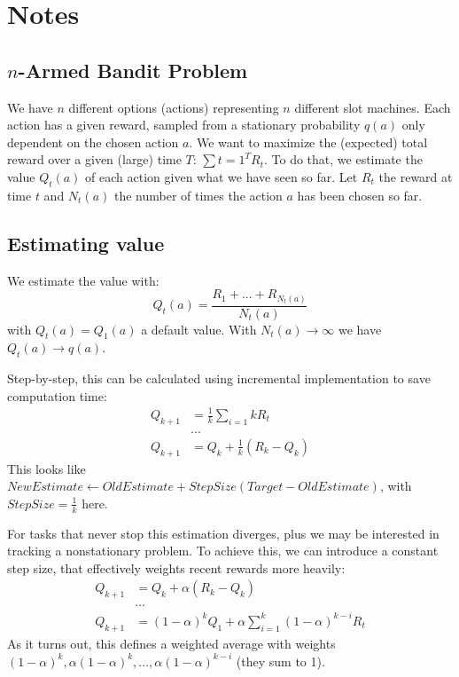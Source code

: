 
\section{Notes}

\subsection{$n$-Armed Bandit Problem}

We have $n$ different options (actions) representing $n$ different slot machines.
Each action has a given reward, sampled from a stationary probability $q(a)$ only dependent on the chosen action $a$.
We want to maximize the (expected) total reward over a given (large) time $T$: $\sum {t=1}^{T} R_t$.
To do that, we estimate the value $Q_t(a)$ of each action given what we have seen so far.
Let $R_t$ the reward at time $t$ and $N_t(a)$ the number of times the action $a$ has been chosen so far.


\subsection{Estimating value}
We estimate the value with:
\[
Q_t(a) = \frac{R_1 + ... + R_{N_{t}(a)}}{N_t(a)}
\]
with $Q_t(a) = Q_1(a)$ a default value.
With $N_t(a) \rightarrow \infty$ we have $Q_t(a) \rightarrow q(a)$.

Step-by-step, this can be calculated using incremental implementation to save computation time:
\begin{align*}
Q_{k+1} &= \frac{1}{k} \sum_{i=1}{k} R_t \\
        & ... \\
Q_{k+1} &= Q_k + \frac{1}{k} \left( R_k - Q_k \right)
\end{align*}
This looks like $\mathit{NewEstimate} \leftarrow \mathit{OldEstimate} + \mathit{StepSize} \left( \mathit{Target} - \mathit{OldEstimate} \right)$, with $\mathit{StepSize} = \frac{1}{k}$ here.

For tasks that never stop this estimation diverges, plus we may be interested in tracking a nonstationary problem.
To achieve this, we can introduce a constant step size, that effectively weights recent rewards more heavily:
\begin{align*}
Q_{k+1} &= Q_k + \alpha \left( R_k - Q_k \right) \\
        & ... \\
Q_{k+1} &= (1 - \alpha)^k Q_1 + \alpha \sum_{i=1}^k (1 - \alpha)^{k-i} R_t
\end{align*}
As it turns out, this defines a weighted average with weights $(1-\alpha)^k, \alpha (1-\alpha)^{k}, ..., \alpha (1-\alpha)^{k-i}$ (they sum to 1).

